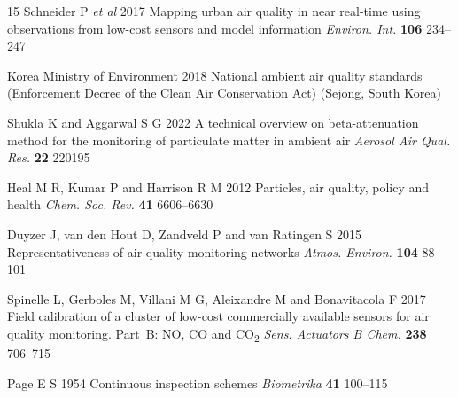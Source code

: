 \documentclass[12pt]{article}
\begin{document}
\begin{thebibliography}{15}
Schneider P \textit{et al} 2017 Mapping urban air quality in near real-time using observations from low-cost sensors and model information \textit{Environ. Int.} \textbf{106} 234--247

Korea Ministry of Environment 2018 National ambient air quality standards (Enforcement Decree of the Clean Air Conservation Act) (Sejong, South Korea)

Shukla K and Aggarwal S G 2022 A technical overview on beta-attenuation method for the monitoring of particulate matter in ambient air \textit{Aerosol Air Qual. Res.} \textbf{22} 220195

Heal M R, Kumar P and Harrison R M 2012 Particles, air quality, policy and health \textit{Chem. Soc. Rev.} \textbf{41} 6606--6630

Duyzer J, van den Hout D, Zandveld P and van Ratingen S 2015 Representativeness of air quality monitoring networks \textit{Atmos. Environ.} \textbf{104} 88--101

Spinelle L, Gerboles M, Villani M G, Aleixandre M and Bonavitacola F 2017 Field calibration of a cluster of low-cost commercially available sensors for air quality monitoring. Part~B: NO, CO and CO\textsubscript{2} \textit{Sens. Actuators B Chem.} \textbf{238} 706--715

Page E S 1954 Continuous inspection schemes \textit{Biometrika} \textbf{41} 100--115

\end{thebibliography}
\end{document}
